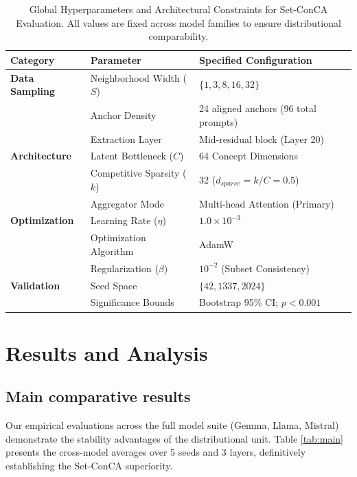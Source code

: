 \documentclass{article}
\begin{document}
\begin{table}[t]
\centering
\caption{Global Hyperparameters and Architectural Constraints for Set-ConCA Evaluation. All values are fixed across model families to ensure distributional comparability.}
\label{tab:setup}
\begin{tabular}{lll}
\toprule
Category & Parameter & Specified Configuration \\
\midrule
\textbf{Data Sampling} 
    & Neighborhood Width ($S$) & $\{1, 3, 8, 16, 32\}$ \\
    & Anchor Density & 24 aligned anchors (96 total prompts) \\
    & Extraction Layer & Mid-residual block (Layer 20) \\
\midrule
\textbf{Architecture} 
    & Latent Bottleneck ($C$) & 64 Concept Dimensions \\
    & Competitive Sparsity ($k$) & 32 ($d_{sparse}=k/C=0.5$) \\
    & Aggregator Mode & Multi-head Attention (Primary) \\
\midrule
\textbf{Optimization} 
    & Learning Rate ($\eta$) & $1.0 \times 10^{-3}$ \\
    & Optimization Algorithm & AdamW \\
    & Regularization ($\beta$) & $10^{-2}$ (Subset Consistency) \\
\midrule
\textbf{Validation} 
    & Seed Space & $\{42, 1337, 2024\}$ \\
    & Significance Bounds & Bootstrap 95\% CI; $p < 0.001$ \\
\bottomrule
\end{tabular}
\end{table}

\section{Results and Analysis}
\subsection*{Main comparative results}
Our empirical evaluations across the full model suite (Gemma, Llama, Mistral) demonstrate the stability advantages of the distributional unit. Table \ref{tab:main} presents the cross-model averages over 5 seeds and 3 layers, definitively establishing the Set-ConCA superiority.
\end{document}
